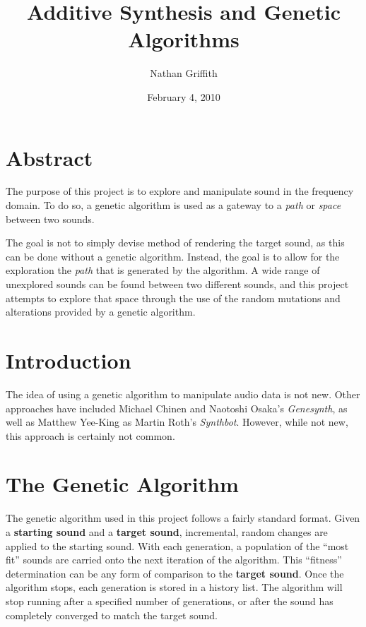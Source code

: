 \documentclass[11pt]{article}
\title{Additive Synthesis and Genetic Algorithms}
\author{Nathan  Griffith}
\date{February 4, 2010}
\begin{document}
\maketitle %

\section{Abstract}
The purpose of this project is to explore and manipulate sound in the frequency domain. To do so, a genetic algorithm is used as a gateway to a \emph{path} or \emph{space} between two sounds. 

The goal is not to simply devise method of rendering the target sound, as this can be done without a genetic algorithm. Instead, the goal is to allow for the exploration the \emph{path} that is generated by the algorithm. A wide range of unexplored sounds can be found between two different sounds, and this project attempts to explore that space through the use of the random mutations and alterations provided by a genetic algorithm. 

\section{Introduction}
The idea of using a genetic algorithm to manipulate audio data is not new. Other approaches have included Michael Chinen and Naotoshi Osaka's \emph{Genesynth}\cite{genesynth}, as well as Matthew Yee-King as Martin Roth's \emph{Synthbot}\cite{synthbot}. However, while not new, this approach is certainly not common.

\section{The Genetic Algorithm}
The genetic algorithm used in this project follows a fairly standard format. Given a {\bf starting sound} and a {\bf target sound}, incremental, random changes are applied to the starting sound. With each generation, a population of the ``most fit'' sounds are carried onto the next iteration of the algorithm. This ``fitness'' determination can be any form of comparison to the {\bf target sound}. Once the algorithm stops, each generation is stored in a history list. The algorithm will stop running after a specified number of generations, or after the sound has completely converged to match the target sound. 
\end{document}
